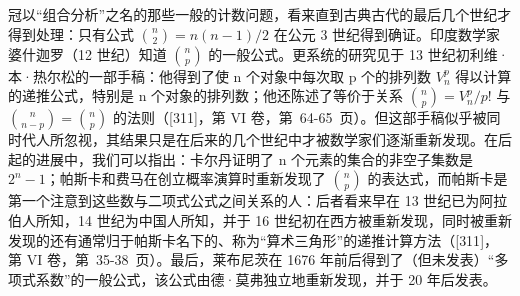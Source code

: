 冠以“组合分析”之名的那些一般的计数问题，看来直到古典古代的最后几个世纪才得到处理：只有公式 \(\binom{n}{2}=n(n-1)/2\) 在公元 3 世纪得到确证。印度数学家婆什迦罗（12 世纪）知道 \(\binom{n}{p}\) 的一般公式。更系统的研究见于 13 世纪初利维·本·热尔松的一部手稿：他得到了使 n 个对象中每次取 p 个的排列数 \(V_{n}^{p}\) 得以计算的递推公式，特别是 n 个对象的排列数；他还陈述了等价于关系 \(\binom{n}{p}=V_{n}^{p}/p!\) 与 \(\binom{n}{n-p}=\binom{n}{p}\) 的法则（{[}311{]}，第 VI 卷，第~64-65~页）。但这部手稿似乎被同时代人所忽视，其结果只是在后来的几个世纪中才被数学家们逐渐重新发现。在后起的进展中，我们可以指出：卡尔丹证明了 n 个元素的集合的非空子集数是 \(2^{n}-1\)；帕斯卡和费马在创立概率演算时重新发现了 \(\binom{n}{p}\) 的表达式，而帕斯卡是第一个注意到这些数与二项式公式之间关系的人：后者看来早在 13 世纪已为阿拉伯人所知，14 世纪为中国人所知，并于 16 世纪初在西方被重新发现，同时被重新发现的还有通常归于帕斯卡名下的、称为“算术三角形”的递推计算方法（{[}311{]}，第 VI 卷，第~35-38~页）。最后，莱布尼茨在 1676 年前后得到了（但未发表）“多项式系数”的一般公式，该公式由德·莫弗独立地重新发现，并于 20 年后发表。


